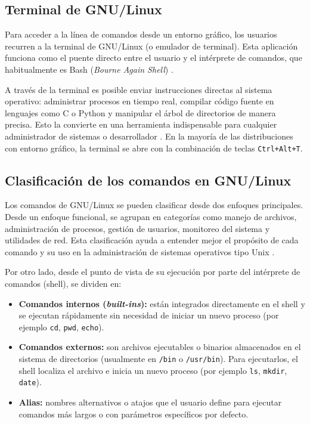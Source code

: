 \subsection{Terminal de GNU/Linux}
Para acceder a la línea de comandos desde un entorno gráfico, los usuarios recurren a la terminal de GNU/Linux (o emulador de terminal). Esta aplicación funciona como el puente directo entre el usuario y el intérprete de comandos, que habitualmente es Bash (\textit{Bourne Again Shell}) \cite{shotts:linux-command-line:2019}.

A través de la terminal es posible enviar instrucciones directas al sistema operativo: administrar procesos en tiempo real, compilar código fuente en lenguajes como C o Python y manipular el árbol de directorios de manera precisa. Esto la convierte en una herramienta indispensable para cualquier administrador de sistemas o desarrollador \cite{ward:how-linux-works:2021}. En la mayoría de las distribuciones con entorno gráfico, la terminal se abre con la combinación de teclas \texttt{Ctrl+Alt+T}.


\subsection{Clasificación de los comandos en GNU/Linux}
\label{sec:prac01:clasificacion-comandos}
Los comandos de GNU/Linux se pueden clasificar desde dos enfoques principales. Desde un enfoque funcional, se agrupan en categorías como manejo de archivos, administración de procesos, gestión de usuarios, monitoreo del sistema y utilidades de red. Esta clasificación ayuda a entender mejor el propósito de cada comando y su uso en la administración de sistemas operativos tipo Unix \cite{nemeth:unix-linux-admin:2017}.

Por otro lado, desde el punto de vista de su ejecución por parte del intérprete de comandos (shell), se dividen en:

\begin{itemize}[leftmargin=*]
    \item \textbf{Comandos internos (\textit{built-ins}):} están integrados directamente en el shell y se ejecutan rápidamente sin necesidad de iniciar un nuevo proceso (por ejemplo \texttt{cd}, \texttt{pwd}, \texttt{echo}).
    \item \textbf{Comandos externos:} son archivos ejecutables o binarios almacenados en el sistema de directorios (usualmente en \texttt{/bin} o \texttt{/usr/bin}). Para ejecutarlos, el shell localiza el archivo e inicia un nuevo proceso (por ejemplo \texttt{ls}, \texttt{mkdir}, \texttt{date}).
    \item \textbf{Alias:} nombres alternativos o atajos que el usuario define para ejecutar comandos más largos o con parámetros específicos por defecto.
\end{itemize}

